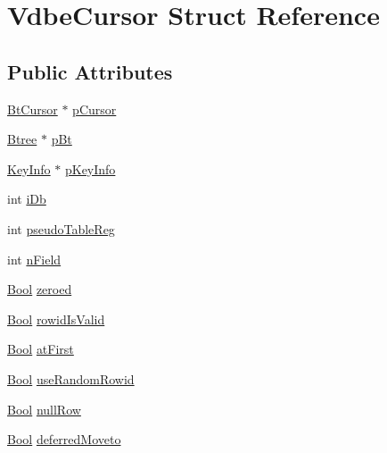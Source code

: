 \hypertarget{struct_vdbe_cursor}{\section{Vdbe\-Cursor Struct Reference}
\label{struct_vdbe_cursor}
}
\subsection*{Public Attributes}
\begin{DoxyCompactItemize}
\item 
\hyperlink{struct_bt_cursor}{Bt\-Cursor} $\ast$ \hyperlink{struct_vdbe_cursor_a9ecb4ab9f7374f92da69f03fc336c293}{p\-Cursor}
\item 
\hyperlink{struct_btree}{Btree} $\ast$ \hyperlink{struct_vdbe_cursor_a287db3fe6d84102fad3d69494b565e9b}{p\-Bt}
\item 
\hyperlink{struct_key_info}{Key\-Info} $\ast$ \hyperlink{struct_vdbe_cursor_a72a6c26ab2ab2ad699dfb45703ea4765}{p\-Key\-Info}
\item 
int \hyperlink{struct_vdbe_cursor_a1215b7b0d1bbd882d6bfb8b118712d89}{i\-Db}
\item 
int \hyperlink{struct_vdbe_cursor_a8618d7c5669c83856e95b8ef72ef67b7}{pseudo\-Table\-Reg}
\item 
int \hyperlink{struct_vdbe_cursor_aa115a60e335e738945127141303eaedb}{n\-Field}
\item 
\hyperlink{sqlite3_8c_a253b248072cfc8bd812c69acd0046eed}{Bool} \hyperlink{struct_vdbe_cursor_abcc5ef422583a743105243e2a0c7859e}{zeroed}
\item 
\hyperlink{sqlite3_8c_a253b248072cfc8bd812c69acd0046eed}{Bool} \hyperlink{struct_vdbe_cursor_a2dabf623f6e3c31aa8310c72ec1843bf}{rowid\-Is\-Valid}
\item 
\hyperlink{sqlite3_8c_a253b248072cfc8bd812c69acd0046eed}{Bool} \hyperlink{struct_vdbe_cursor_a00d121ca0f21e7381aacb89adf40e8b6}{at\-First}
\item 
\hyperlink{sqlite3_8c_a253b248072cfc8bd812c69acd0046eed}{Bool} \hyperlink{struct_vdbe_cursor_a067fff911d6d37190785a0cf5ba4fc8e}{use\-Random\-Rowid}
\item 
\hyperlink{sqlite3_8c_a253b248072cfc8bd812c69acd0046eed}{Bool} \hyperlink{struct_vdbe_cursor_af7c01a62f0445440e4200f7601ab0a15}{null\-Row}
\item 
\hyperlink{sqlite3_8c_a253b248072cfc8bd812c69acd0046eed}{Bool} \hyperlink{struct_vdbe_cursor_ad2da7e0fd569b01c89c18e4dff1b335d}{deferred\-Moveto}
\item 

\end{DoxyCompactItemize}
